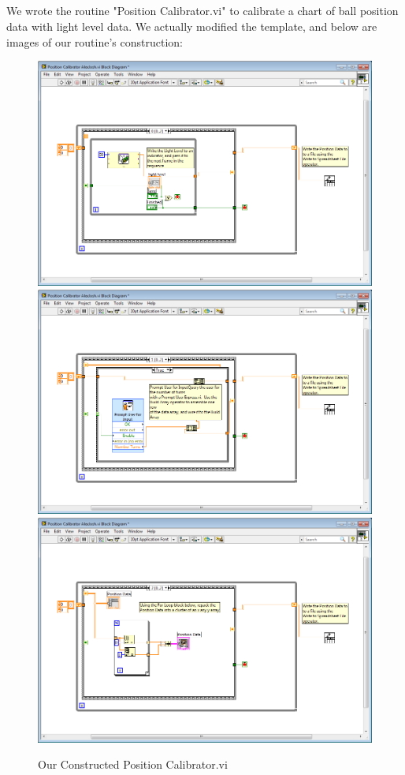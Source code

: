 \documentclass{article}
\begin{document}
\subsection{}
    We wrote the routine "Position Calibrator.vi" to calibrate a chart of ball position data with light level data. We actually modified the template, and below are images of our routine's construction:
    \begin{figure}[H]
        \centering
        \includegraphics[scale = 0.3]{12a.PNG}
        \includegraphics[scale = 0.3]{12b.PNG}
        \includegraphics[scale = 0.3]{12c.PNG}
        \caption{Our Constructed Position Calibrator.vi \cite{lab11}}
        \label{fig:my_label}
    \end{figure}
\end{document}
